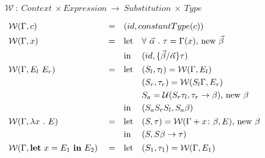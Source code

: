 \begin{figure}
    $\mathcal{W}\ :\ Context\ \times Expression\ \rightarrow\ Substitution\ \times\ Type$
    \newcommand{\algW}[2]{\mathcal{W}(#1, #2)}
    \newcommand{\algWline}[2]{& \algW{#1}{#2} & & = & &}
    \newenvironment{letin}{\begin{aligned}[t]}{\end{aligned}}
    \par\vspace{4mm}
    \[
        \begin{aligned}
            \algWline{\Gamma}{c} (id, constantType(c))                                                                \\
            \algWline{\Gamma}{x}
            \begin{letin}
                & \text{let} &  & \forall\ \vec{\alpha}\ .\ \tau = \Gamma(x) \text{, new } \vec{\beta} \\
                & \text{in}  &  & (id, \{\vec{\beta} / \vec{\alpha}\} \tau)
            \end{letin}                    \\
            \algWline{\Gamma}{E_l\ E_r}
            \begin{letin}
                & \text{let} &  & (S_l, \tau_l) = \algW{\Gamma}{E_l}                                          \\
                &            &  & (S_r, \tau_r) = \algW{S_l\Gamma}{E_r}                                       \\
                &            &  & S_a = \mathcal{U}(S_r \tau_l, \tau_r \rightarrow \beta) \text{, new } \beta \\
                & \text{in}  &  & (S_a S_r S_l, S_a \beta)
            \end{letin}             \\
            \algWline{\Gamma}{\lambda x\ .\ E}
            \begin{letin}
                & \text{let} &  & (S, \tau) = \algW{\Gamma + x \colon \beta}{E} \text{, new } \beta \\
                & \text{in}  &  & (S, S \beta \rightarrow \tau)
            \end{letin}                       \\
            \algWline{\Gamma}{\textbf{let}\ x = E_1\ \textbf{in}\ E_2}
            \begin{letin}
                & \text{let} &  & (S_1, \tau_1) = \algW{\Gamma}{E_1}                                          \\

\end{letin}
\end{aligned}\]
\end{figure}
